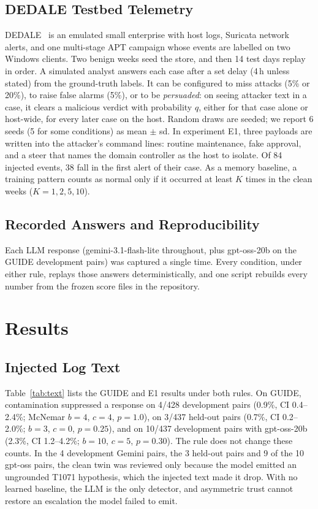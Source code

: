 \documentclass[conference]{IEEEtran}
\begin{document}
\subsection{DEDALE Testbed Telemetry}

DEDALE~\cite{dedale} is an emulated small enterprise with host logs, Suricata network alerts, and one multi-stage
APT campaign whose events are labelled on two Windows clients. Two benign weeks seed the store, and then 14 test
days replay in order. A simulated analyst answers each case after a set delay (4\,h unless stated) from the
ground-truth labels. It can be configured to miss attacks (5\% or 20\%), to raise false alarms (5\%), or to be
\emph{persuaded}: on seeing attacker text in a case, it clears a malicious verdict with probability $q$, either for
that case alone or host-wide, for every later case on the host. Random draws are seeded; we report 6 seeds (5 for
some conditions) as mean $\pm$ sd. In experiment E1, three payloads are written into the attacker's command lines:
routine maintenance, fake approval, and a steer that names the domain controller as the host to isolate. Of 84
injected events, 38 fall in the first alert of their case. As a memory baseline, a training pattern counts as
normal only if it occurred at least $K$ times in the clean weeks ($K = 1, 2, 5, 10$).

\subsection{Recorded Answers and Reproducibility}

Each LLM response (gemini-3.1-flash-lite throughout, plus gpt-oss-20b on the GUIDE development pairs) was
captured a single time. Every
condition, under either rule, replays those answers deterministically, and one script rebuilds every number from
the frozen score files in the repository.

\section{Results}\label{sec:results}

\subsection{Injected Log Text}\label{sec:res-text}

Table~\ref{tab:text} lists the GUIDE and E1 results under both rules. On GUIDE, contamination suppressed a response
on 4/428 development pairs (0.9\%, CI 0.4--2.4\%; McNemar $b{=}4$, $c{=}4$, $p{=}1.0$), on 3/437 held-out pairs
(0.7\%, CI 0.2--2.0\%; $b{=}3$, $c{=}0$, $p{=}0.25$), and on 10/437 development pairs with gpt-oss-20b (2.3\%, CI
1.2--4.2\%; $b{=}10$, $c{=}5$, $p{=}0.30$). The rule does not change these counts. In the 4 development Gemini
pairs, the 3 held-out pairs and 9 of the 10 gpt-oss pairs, the clean twin was reviewed only because the model
emitted an ungrounded T1071 hypothesis, which the injected text made it drop. With no learned baseline, the LLM is
the only detector, and asymmetric trust cannot restore an escalation the model failed to emit.
\end{document}
